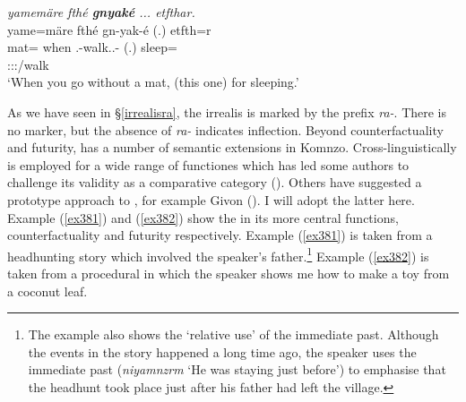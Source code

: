 \begin{exe}
	\ex \emph{yamemäre fthé \textbf{gnyaké} ... etfthar.}\\
	\glll yame=märe fthé gn-yak-é (.) etfth=r\\
	mat=\Priv{} when \Stsg.\Bet-walk.\Ext.\Ndu-\Imp{} (.) sleep=\Purp\\
	{} {} \footnotesize{\Ssg:\Sbj:\Imp:\Ipfv/walk} {} {}\\
	\trans `When you go without a mat, (this one) for sleeping.'\\ 
	\label{ex318}
\end{exe}

As we have seen in \S{}\ref{irrealisra}, the irrealis is marked by the prefix \emph{ra-}. There is no  marker, but the absence of \emph{ra-} indicates  inflection. Beyond counterfactuality and futurity,   has a number of semantic extensions in Komnzo. Cross-linguistically   is employed for a wide range of functiones which has led some authors to challenge its validity as a comparative category (\citealt{Bybee:irrealis}). Others have suggested a prototype approach to  , for example Givon (\citeyear[327]{Givon:1994ko}). I will adopt the latter here. Example (\ref{ex381}) and (\ref{ex382}) show the   in its more central functions, counterfactuality and futurity respectively. Example (\ref{ex381}) is taken from a headhunting story which involved the speaker's father.\footnote{The example also shows the `relative use' of the immediate past. Although the events in the story happened a long time ago, the speaker uses the immediate past (\emph{niyamnzrm} `He was staying just before') to emphasise that the headhunt took place just after his father had left the village.} Example (\ref{ex382}) is taken from a procedural in which the speaker shows me how to make a toy from a coconut leaf.

